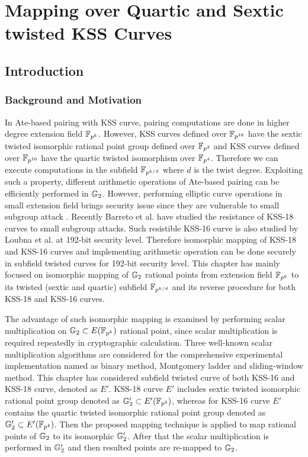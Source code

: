 \chapter{Mapping over Quartic and Sextic twisted KSS Curves}
\label{ch:ijnc2017}
\section{Introduction}
\subsection{Background and Motivation}
In Ate-based pairing with KSS curve,  pairing computations are done in higher degree extension field $\mathbb{F}_{p^k}$.
However, KSS curves defined over $\mathbb{F}_{p^{18}}$ have the sextic twisted isomorphic rational point group defined over $\mathbb{F}_{p^3}$ and KSS curves defined over $\mathbb{F}_{p^{16}}$ have the quartic twisted  isomorphism over $\mathbb{F}_{p^4}$. 
Therefore we can execute computations in the subfield $\mathbb{F}_{p^{k/d}}$ where $d$ is the twist degree. 
Exploiting such a property, different arithmetic operations of Ate-based pairing can be efficiently performed in ${\mathbb{G}}_{2}$.  
However, performing elliptic curve operations in small extension field brings security issue since they are vulnerable to small subgroup attack \cite{C:LimLee97}. 
Recently Barreto et al. \cite{LC:BCMNPZ15} have studied the resistance of  KSS-18 curves to small subgroup attacks. 
Such resistible KSS-16 curve is also studied by Loubna et al. \cite{EPRINT:GhaFou16b} at 192-bit security level. 
Therefore isomorphic mapping of KSS-18 and KSS-16 curves and implementing arithmetic operation can be done securely in subfield twisted curves for 192-bit security level.
This chapter has mainly focused on isomorphic mapping of ${\mathbb{G}}_{2}$ rational points from extension field $\mathbb{F}_{p^k}$ to its twisted (sextic and quartic) subfield $\mathbb{F}_{p^{k/d}}$ and its reverse procedure for both KSS-18 and KSS-16 curves. 

The advantage of such isomorphic mapping is examined by performing scalar multiplication on ${\mathbb{G}}_{2} \subset E(\mathbb{F}_{p^k})$ rational point, since scalar multiplication is required repeatedly in cryptographic calculation. 
Three well-known scalar multiplication algorithms are considered for the comprehensive experimental implementation named as binary method, Montgomery ladder and sliding-window method.
This chapter has considered subfield  twisted curve of both  KSS-16 and KSS-18 curve, denoted as $E'$. 
KSS-18 curve $E'$ includes sextic twisted isomorphic rational point group denoted as ${\mathbb{G}}_{2}' \subset E'(\mathbb{F}_{p^3})$, whereas  for KSS-16 curve $E'$ contains the quartic twisted  isomorphic rational point group denoted as ${\mathbb{G}}_{2}' \subset E'(\mathbb{F}_{p^4})$.
Then the proposed mapping technique is applied to map rational points of ${\mathbb{G}}_{2}$ to its isomorphic ${\mathbb{G}}_{2}'$. 
After that the scalar multiplication  is performed  in ${\mathbb{G}}_{2}'$ and then resulted points are re-mapped to ${\mathbb{G}}_{2}$.

